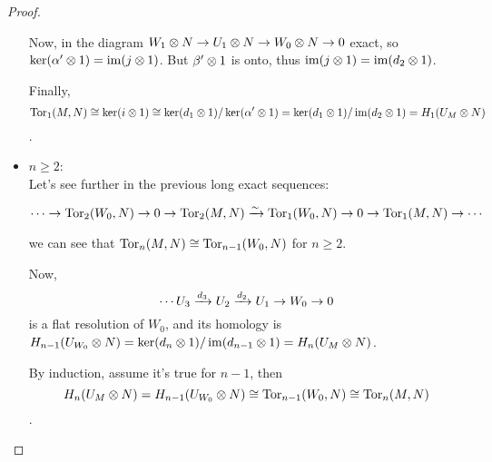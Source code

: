 \begin{theorem}
\begin{proof}
\begin{itemize}
    Now, in the diagram $W_1 \otimes N \to U_1 \otimes N \to W_0 \otimes N \to 0$ exact, so 
    $\ker (\alpha' \otimes 1) = \operatorname{im} (j \otimes 1)$. But $\beta' \otimes 1$ is onto, thus 
    $\operatorname{im} (j \otimes 1) = \operatorname{im} (d_2 \otimes 1)$. 

    Finally, 
    $$\operatorname{Tor}_1(M, N) \cong \ker(i \otimes 1) \cong \ker (d_1 \otimes 1) / \ker(\alpha' \otimes 1)
    = \ker (d_1 \otimes 1) / \operatorname{im}(d_2 \otimes 1) = H_1(U_M \otimes N)$$.

    \item $n \ge 2$: \\
      Let's see further in the previous long exact sequences:

      $$\cdots \to \operatorname{Tor}_2(W_0, N) \to 0 \to \operatorname{Tor}_2(M, N)
      \xrightarrow{\sim} \operatorname{Tor}_1(W_0, N) \to 0 \to \operatorname{Tor}_1(M, N) \to \cdots
      $$

      we can see that $\operatorname{Tor}_n(M, N) \cong \operatorname{Tor}_{n-1}(W_0, N)$ for $n \ge 2$.

      Now, 
      $$\cdots U_3 \xrightarrow{d_3} U_2 \xrightarrow{d_2} U_1 \to W_0 \to 0$$
      is a flat resolution of $W_0$, and its homology is 
      $H_{n-1}(U_{W_0} \otimes N) = \ker(d_n \otimes 1) / \operatorname{im}(d_{n-1} \otimes 1) = H_n(U_M \otimes N)$.

      By induction, assume it's true for $n-1$, then
      $$H_n(U_M \otimes N) = H_{n-1}(U_{W_0} \otimes N) \cong \operatorname{Tor}_{n-1}(W_0, N) \cong \operatorname{Tor}_n(M, N)$$.

    \end{itemize}

  \end{proof}
\end{theorem}
